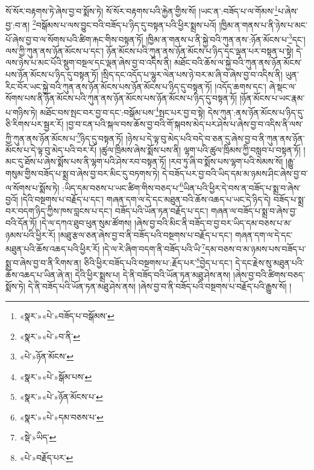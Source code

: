 སོ་སོར་བརྟགས་ཏེ་ཞེས་བྱ་བ་སྨོས་ཏེ། སོ་སོར་བརྟགས་པའི་རྐྱེན་གྱིས་སོ། །ཡང་ན་:བཟོད་པ་ལ་གོམས་\footnote{«སྣར་»«པེ་»བཟོད་པ་བསྒོམས་}པ་ཞེས་བྱ་:བ་ན། \footnote{«སྣར་»«པེ་»བ་ནི་}བསྒོམས་པ་ལས་བྱུང་བའི་བཟོད་པ་ཉིད་དུ་བསྟན་པའི་ཕྱིར་སྨྲས་པའོ། །ཁྱིམ་ན་གནས་པ་ནི་ཉེས་པ་མང་པོ་ཞེས་བྱ་བ་ལ་སོགས་པའི་ཚིག་རྐང་གིས་བསྟན་ཏོ། །ཁྱིམ་ན་གནས་པ་ནི་སྐྱེ་བའི་ཀུན་ནས་:ཉོན་མོངས་པ་\footnote{«པེ་»ཉོན་མོངས་}དང་། ལས་ཀྱི་ཀུན་ནས་ཉོན་མོངས་པ་དང་། ཉོན་མོངས་པའི་ཀུན་ནས་ཉོན་མོངས་པ་ཉིད་དང་ལྡན་པར་བསྟན་པ་སྟེ། དེ་ལས་ཉེས་པ་མང་པོའི་སྡུག་བསྔལ་དང་ལྡན་ཞེས་བྱ་བ་འདིས་ནི། མཐོང་བའི་ཆོས་ལ་སྐྱེ་བའི་ཀུན་ནས་ཉོན་མོངས་པས་ཉོན་མོངས་པ་ཉིད་དུ་བསྟན་ཏོ། །སྲིད་དང་འདོད་པ་ལྷུར་ལེན་པས་ཉེ་བར་མ་ཞི་བ་ཞེས་བྱ་བ་འདིས་ནི། ཡུན་རིང་བོར་ཡང་སྐྱེ་བའི་ཀུན་ནས་ཉོན་མོངས་པས་ཉོན་མོངས་པ་ཉིད་དུ་བསྟན་ཏོ། །འདོད་ཆགས་དང་། ཞེ་སྡང་ལ་སོགས་པས་ནི་ཉོན་མོངས་པའི་ཀུན་ནས་ཉོན་མོངས་པས་ཉོན་མོངས་པ་ཉིད་དུ་བསྟན་ཏོ། །ཉོན་མོངས་པ་ཡང་རྣམ་པ་གཉིས་ཏེ། མཐོང་བས་སྤང་བར་བྱ་བ་དང་:བསྒོམ་པས་\footnote{«སྣར་»«པེ་»སྒོམ་པས་}སྤང་པར་བྱ་བ་སྟེ། དེས་ཀུན་:ནས་ཉོན་མོངས་པ་ཉིད་དུ་ཅི་རིགས་པར་སྦྱར་རོ། །བྱ་བ་ངན་པའི་སྐལ་བས་ཆོས་བྱ་བའི་གོ་སྐབས་མེད་པར་ཤེས་པ་ཞེས་བྱ་བ་འདིས་ནི་ལས་ཀྱི་ཀུན་ནས་ཉོན་མོངས་པ་\footnote{«སྣར་»«པེ་»ཉོན་མོངས་པ་}ཉིད་དུ་བསྟན་ཏོ། །ཉེས་པ་དེ་ལྟ་བུ་མེད་པའི་བདེ་བ་ཅན་དུ་ཞེས་བྱ་བ་ནི་ཀུན་ནས་ཉོན་མོངས་པ་དེ་ལྟ་བུ་མེད་པའི་བར་རོ། །ཚུལ་ཁྲིམས་ཞེས་སྨོས་པས་ནི། ལྷག་པའི་ཚུལ་ཁྲིམས་ཀྱི་བསླབ་པ་བསྟན་ཏོ། །མང་དུ་ཐོས་པ་ཞེས་སྨོས་པས་ནི་ལྷག་པའི་ཤེས་རབ་བསྟན་ཏོ། །རབ་ཏུ་ཞི་བ་སྨོས་པས་ལྷག་པའི་སེམས་སོ། །རྒྱུ་གསུམ་གྱིས་བཟོད་པ་སྨྲ་བ་ཞེས་བྱ་བར་མིང་དུ་བཏགས་ཏེ། དེ་བཟོད་པར་བྱ་བའི་ཡིད་དམ་མ་ཉམས་ཤིང་ཞེས་བྱ་བ་ལ་སོགས་པ་སྨོས་ཏེ། :ཡིད་དམ་བཅས་པ་ཡང་ཚིག་གིས་བཅད་པ་\footnote{«སྣར་»«པེ་»དམ་བཅས་པ་}ཡིན་པའི་ཕྱིར་དེ་བས་ན་བཟོད་པ་སྨྲ་བ་ཞེས་བྱའོ། །དེའི་བསྔགས་པ་བརྗོད་པ་དང་། གཞན་དག་ལ་དེ་དང་མཐུན་བའི་ཆོས་འཆད་པ་ཡང་དེ་ཉིད་དེ། བཟོད་པ་སྨྲ་བར་བདག་ཉིད་ཀྱིས་ཁས་བླངས་པ་དང་། བཟོད་པའི་ཡོན་ཏན་བརྗོད་པ་དང་། གཞན་ལ་བཟོད་པ་སྨྲ་བ་ཞེས་བྱ་བའི་དོན་ཏོ། །དེ་ལ་དཀའ་ཐུབ་ཕུན་སུམ་ཚོགས། །ཞེས་བྱ་བའི་མིང་ནི་བཟོད་བ་བྱ་བར་ཡིད་དམ་བཅས་པ་མ་ཉམས་པའི་ཕྱིར་རོ། །མཐུ་རྩལ་ཅན་ཞེས་བྱ་བ་ནི་བཟོད་པའི་བསྔགས་པ་བརྗོད་པ་དང་། གཞན་དག་ལ་དེ་དང་མཐུན་པའི་ཆོས་འཆད་པའི་ཕྱིར་རོ། །དེ་ལ་རེ་ཞིག་བདག་ནི་བཟོད་པའི་ཡི་\footnote{«སྡེ་»ཡིད་}དམ་བཅས་བ་མ་ཉམས་པས་བཟོད་པ་སྨྲ་བ་ཞེས་བྱ་བ་ནི་རིགས་ན། ཅིའི་ཕྱིར་བཟོད་པའི་བསྔགས་པ་:རྗོད་པར་\footnote{«པེ་»བརྗོད་པར་}བྱེད་པ་དང་། དེ་དང་རྗེས་སུ་མཐུན་པའི་ཆོས་འཆད་པ་ཡིན་ཞེ་ན། དེའི་ཕྱིར་སྨྲས་པ། དེ་ནི་བཟོད་བའི་ཡོན་ཏན་མཐུ་ཤེས་ནས། །ཞེས་བྱ་བའི་ཚིགས་བཅད་སྨོས་ཏེ། དེ་ནི་བཟོད་པའི་ཡོན་ཏན་མཐུ་ཤེས་ནས། །ཞེས་བྱ་བ་ནི་བཟོད་པའི་བསྔགས་པ་བརྗོད་པའི་རྒྱུས་སོ། །
